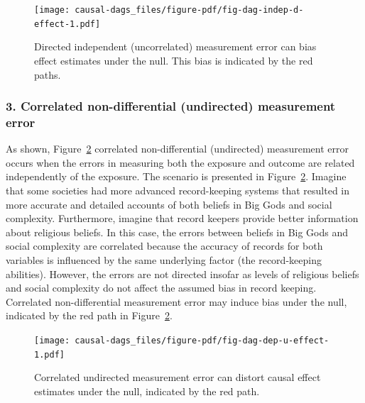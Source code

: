 \documentclass[
  singlecolumn]{article}
\begin{document}
\begin{figure}

{\centering \texttt{[image: causal-dags\_files/figure-pdf/fig-dag-indep-d-effect-1.pdf]}

}

\caption{\label{fig-dag-indep-d-effect}Directed independent
(uncorrelated) measurement error can bias effect estimates under the
null. This bias is indicated by the red paths.}

\end{figure}

\hypertarget{correlated-non-differential-undirected-measurement-error}{%
\subsubsection{3. Correlated non-differential (undirected) measurement
error}\label{correlated-non-differential-undirected-measurement-error}}

As shown, Figure~\ref{fig-dag-dep-u-effect} correlated non-differential
(undirected) measurement error occurs when the errors in measuring both
the exposure and outcome are related independently of the exposure. The
scenario is presented in Figure~\ref{fig-dag-dep-u-effect}. Imagine that
some societies had more advanced record-keeping systems that resulted in
more accurate and detailed accounts of both beliefs in Big Gods and
social complexity. Furthermore, imagine that record keepers provide
better information about religious beliefs. In this case, the errors
between beliefs in Big Gods and social complexity are correlated because
the accuracy of records for both variables is influenced by the same
underlying factor (the record-keeping abilities). However, the errors
are not directed insofar as levels of religious beliefs and social
complexity do not affect the assumed bias in record keeping. Correlated
non-differential measurement error may induce bias under the null,
indicated by the red path in Figure~\ref{fig-dag-dep-u-effect}.

\begin{figure}

{\centering \texttt{[image: causal-dags\_files/figure-pdf/fig-dag-dep-u-effect-1.pdf]}

}

\caption{\label{fig-dag-dep-u-effect}Correlated undirected measurement
error can distort causal effect estimates under the null, indicated by
the red path.}

\end{figure}
\end{document}
